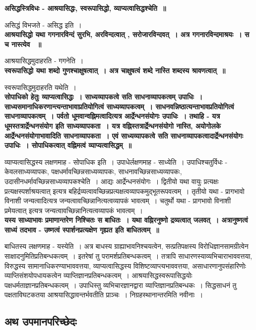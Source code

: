 {\bfseries असिद्धस्त्रिविधः - आश्रयासिद्धः, स्वरूपासिद्धो, व्याप्यत्वासिद्धश्चेति~॥}\par
	असिद्धं विभजते - असिद्ध इति~।\\[10pt]
{\bfseries आश्रयासिद्धो यथा गगनारविन्दं सुरभि, अरविन्दत्वात् , सरोजारविन्दवत्~। अत्र गगनारविन्दमाश्रयः~। स च नास्त्येव ~॥}\par
	आश्रयासिद्धमुदाहरति - गगनेति~।\\[10pt]
{\bfseries स्वरूपासिद्धो यथा शब्दो गुणश्चाक्षुषत्वात्~। अत्र चाक्षुषत्वं शब्दे नास्ति शब्दस्य श्रावणत्वात्~॥}\par
	स्वरूपासिद्धमुदाहरति यथेति~।\\[10pt]
{\bfseries सोपाधिको हेतुः व्याप्यत्वासिद्धः~। साध्यव्यापकत्वे सति साधनाव्यापकत्वम् उपाधिः~। साध्यसमानाधिकरणान्त्यन्ताभावाप्रतियोगित्वं साध्यव्यापकत्वम्~। साधनवन्निष्ठात्यन्ताभावप्रतियोगित्वं साधनाव्यापकत्वम्~। पर्वतो धूमवान्वह्निमत्वादित्यत्र आर्द्रेन्धनसंयोगः उपाधिः~। तथाहि - यत्र धूमस्तत्रार्द्रेन्धनसंयोग इति साध्यव्यापकता~। यत्र वह्निस्तत्रार्द्रेन्धनसंयोगो नास्ति, अयोगोलके आर्द्रेन्धनसंयोगाभावादिति साधनाव्यापकता~। एवं साध्यव्यापकत्वे सति साधनाव्यापकत्वादार्द्रेन्धनसंयोगः उपाधिः~। सोपाधिकत्वात् वह्निमत्वं व्याप्यत्वासिद्धम्~॥}\par
	व्याप्यत्वासिद्धस्य लक्षणमाह - सोपाधिक इति~। उपाधेर्लक्षणमाह - साध्येति~। उपाधिश्चतुर्विधः - केवलसाध्यव्यापकः, पक्षधर्मावच्छिन्नसाध्यव्यापकः, साधनावच्छिन्नसाध्यव्यापकः, उदासीनधर्मावच्छिन्नसाध्यव्यापकश्चेति~। आद्यः आर्द्रेन्धनसंयोगः~। द्वितीयो यथा वायुः प्रत्यक्षः प्रत्यक्षस्पर्शाश्रयत्वात् इत्यत्र बहिर्द्रव्यत्वावच्छिन्नप्रत्यक्षत्वव्यापकमुद्भूतरूपवत्वम्~। तृतीयो यथा - प्रागभावो विनाशी जन्यत्वादित्यत्र जन्यत्वावच्छिन्नानित्यत्वव्यापकं भावत्वम्~। चतुर्थो यथा - प्रागभावो विनाशी प्रमेयत्वात् इत्यत्र जन्यत्वावच्छिन्नानित्यत्वव्यापकं भावत्वम्~।\\[10pt]
{\bfseries यस्य साध्याभावः प्रमाणान्तरेण निश्चितः स बाधितः~। यथा वह्निरनुष्णो द्रव्यत्वात् जलवत्~। अत्रानुष्णत्वं साध्यं तदभाव - उष्णत्वं स्पार्शनप्रत्यक्षेण गृह्यत इति बाधितत्वम्~॥}\par
	बाधितस्य लक्षणमाह - यस्येति~। अत्र बाधस्य ग्राह्याभावनिश्चयत्वेन, सत्प्रतिपक्षस्य विरोधिज्ञानसामग्रीत्वेन साक्षादनुमितिप्रतिबन्धकत्वम्~। इतरेषां तु परामर्शप्रतिबन्धकत्वम्~। तत्रापि साधारणस्याव्यभिचाराभाववत्तया, विरुद्धस्य सामानाधिकरण्याभाववत्तया, व्याप्यत्वासिद्धस्य विशिष्टव्याप्त्यभाववत्तया, असाधारणानुपसंहारिणोः व्याप्तिसंशयोपधायकत्वेन व्याप्तिज्ञानप्रतिबन्धकत्वम्~। आश्रयासिद्धस्वरूपासिद्धयोः पक्षधर्मताज्ञानप्रतिबन्धकत्वम्~। उपाधिस्तु व्यभिचारज्ञानद्वारा व्याप्तिज्ञानप्रतिबन्धकः~। सिद्धसाधनं तु पक्षताविघटकतया आश्रयासिद्धावन्तर्भवतीति प्राञ्चः~। निग्रहस्थानान्तरमिति नवीनाः~। \subsection*{अथ उपमानपरिच्छेदः}
